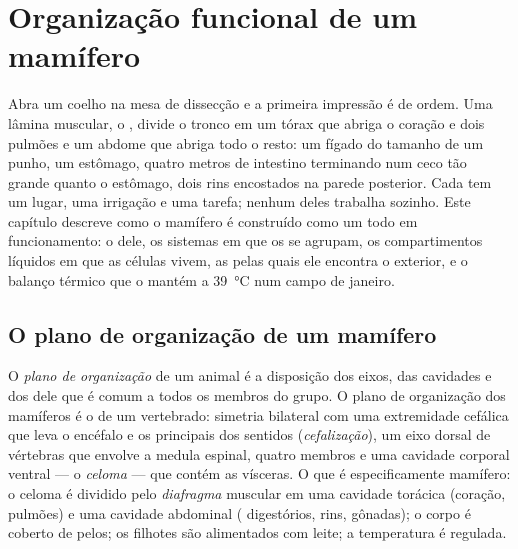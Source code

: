\chapter{Organização funcional de um mamífero}\label{ch:b1:mammal-organization}

Abra um coelho na mesa de dissecção e a primeira impressão é de ordem.
Uma lâmina muscular, o , divide o tronco em um tórax que abriga
o coração e dois pulmões e um abdome que abriga todo o resto: um fígado
do tamanho de um punho, um estômago, quatro metros de intestino
terminando num ceco tão grande quanto o estômago, dois rins encostados
na parede posterior. Cada  tem um lugar, uma irrigação e uma
tarefa; nenhum deles trabalha sozinho. Este capítulo descreve como o
mamífero é construído como um todo em funcionamento: o  dele, os sistemas em que os  se agrupam, os
compartimentos líquidos em que as células vivem, as 
pelas quais ele encontra o exterior, e o balanço térmico que o mantém a
\qty{39}{\celsius} num campo de janeiro.

\section{O plano de organização de um mamífero}

\begin{definition}\label{def:b1:mammal-organization:bodyplan}
O \emph{plano de organização} de um animal é
a disposição dos eixos, das cavidades e dos  dele que é comum a
todos os membros do grupo. O plano de organização dos mamíferos é o de
um vertebrado: simetria bilateral com uma extremidade cefálica que leva
o encéfalo e os principais  dos sentidos
(\emph{cefalização}), um eixo dorsal de vértebras que
envolve a medula espinal, quatro membros e uma cavidade corporal ventral
--- o \emph{celoma} --- que contém as vísceras. O que é
especificamente mamífero: o celoma é dividido pelo
\emph{diafragma} muscular em uma cavidade torácica
(coração, pulmões) e uma cavidade abdominal ( digestórios, rins,
gônadas); o corpo é coberto de pelos; os filhotes são alimentados com
leite; a temperatura é regulada.
\end{definition}


